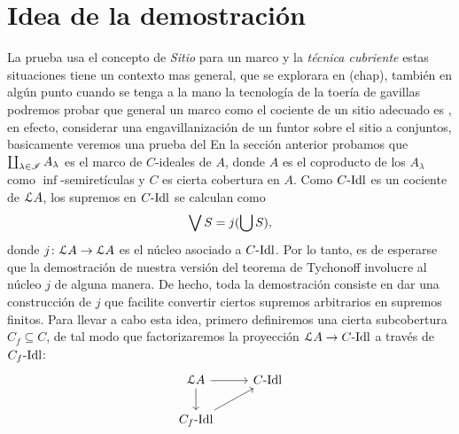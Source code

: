 \section{Idea de la demostración}
La prueba usa el concepto de \emph{Sitio} para un marco y la \emph{técnica cubriente} estas situaciones tiene un contexto mas general, que se explorara en (chap), también en algún punto cuando se tenga a la mano la tecnología de la toería de gavillas podremos probar que general un marco como el cociente de un sitio adecuado es , en efecto, considerar una engavillanización de un funtor sobre el sitio a conjuntos, basicamente veremos una prueba del \cite[Lemma V.1.7]{johnstone1986stone} 
En la sección anterior probamos que
$\coprod_{\lambda\in\scr I}A_\lambda$
es el marco de $C$-ideales de $A$, donde $A$ es el coproducto
de los $A_\lambda$ como $\inf$-semiretículas y $C$ es cierta
cobertura en $A$.
Como $C\Idl$ es un cociente de $\cal LA$,
los supremos en $C\Idl$ se calculan como
\[
    \Sup S = j(\bigcup S)
,\]
donde $j\colon\cal LA\to\cal LA$ es el núcleo asociado a $C\Idl$.
Por lo tanto, es de esperarse que la demostración de
nuestra versión del teorema de Tychonoff involucre al núcleo
$j$ de alguna manera.
De hecho, toda la demostración consiste
en dar una construcción de $j$ que facilite convertir
ciertos supremos arbitrarios en supremos finitos.
Para llevar a cabo esta idea, primero definiremos una
cierta subcobertura $C_f\subseteq C$, de tal modo que
factorizaremos la proyección $\cal LA\to C\Idl$ a través de
$C_f\Idl$:
\[
    \begin{tikzcd}
        \cal LA \ar[d] \ar[r] & C\Idl \\
        C_f\Idl \ar[ur]
    \end{tikzcd}
\]

